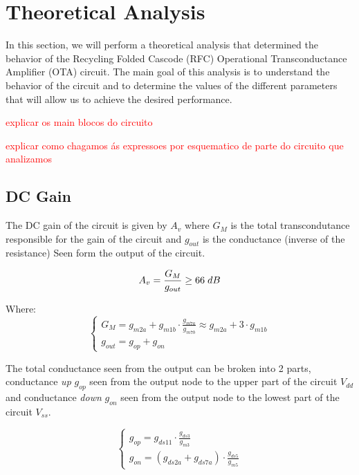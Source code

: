 \section{Theoretical Analysis}

In this section, we will perform a theoretical analysis that determined the behavior of the Recycling Folded Cascode (RFC) Operational Transconductance Amplifier (OTA) circuit. The main goal of this analysis is to understand the behavior of the circuit and to determine the values of the different parameters that will allow us to achieve the desired performance.

\textcolor{red}{explicar os main blocos do circuito}

\textcolor{red}{explicar como chagamos ás expressoes por esquematico de parte do circuito que analizamos}
\subsection {DC Gain}

The DC gain of the circuit is given by $A_v$ where $G_M$ is the total transcondutance responsible for the gain of the circuit and $g_{out}$ is the conductance (inverse of the resistance) Seen form the output of the circuit.

$$A_v =  \frac{G_M}{g_{out}} \geq 66\hspace{0.1cm}dB$$

Where:
\begin{equation}
    \begin{cases}
        G_M = g_{m2a} + g_{m1b} \cdot \frac{g_{m7a}}{g_{m7b}} \approx g_{m2a} + 3 \cdot g_{m1b} \\
        g_{out} = g_{op} + g_{on}
    \end{cases}
\end{equation}

The total conductance seen from the output can be broken into 2 parts, conductance \textit{up} $g_{op}$ seen from the output node to the upper part of the circuit $V_{dd}$ and conductance \textit{down} $g_{on}$ seen from the output node to the lowest part of the circuit $V_{ss}$.

\begin{equation}
    \begin{cases}
        g_{op} = g_{ds11} \cdot \frac{g_{ds3}}{g_{m3}} \\
        g_{on} = \left( g_{ds2a} + g_{ds7a} \right) \cdot \frac{g_{ds5}}{g_{m5}}
    \end{cases}
\end{equation}

